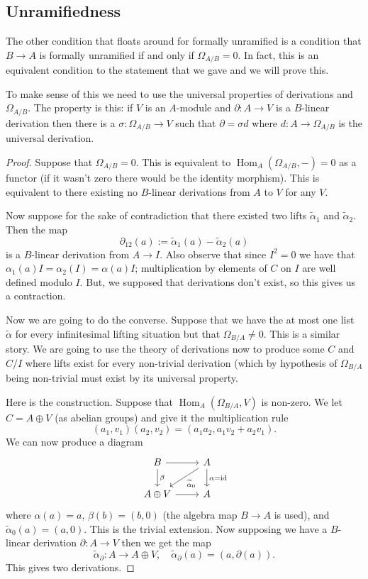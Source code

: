 \documentclass[12pt]{article}
\numberwithin{equation}{section}
\theoremstyle{definition}
\theoremstyle{remark}
\newcommand{\id}{\operatorname{id}}
\newcommand{\Hom}{\operatorname{Hom}}
\begin{document}
\subsection{Unramifiedness}
The other condition that floats around for formally unramified is a condition that $B\to A$ is formally unramified if and only if $\Omega_{A/B}=0$. 
In fact, this is an equivalent condition to the statement that we gave and we will prove this. 

To make sense of this we need to use the universal properties of derivations and $\Omega_{A/B}$. The property is this: if $V$ is an $A$-module and $\partial:A\to V$ is a $B$-linear derivation then there is a $\sigma: \Omega_{A/B} \to V$ such that $\partial = \sigma d$ where $d:A \to \Omega_{A/B}$ is the universal derivation.

\begin{proof}
	Suppose that $\Omega_{A/B}=0$. 
	This is equivalent to $\Hom_A(\Omega_{A/B},-)=0$ as a functor (if it wasn't zero there would be the identity morphism).
	This is equivalent to there existing no $B$-linear derivations from $A$ to $V$ for any $V$. 
	
	Now suppose for the sake of contradiction that there existed two lifts $\widetilde{\alpha}_1$ and $\widetilde{\alpha}_2$. 
	Then the map 
	$$\partial_{12}(a) := \widetilde{\alpha}_1(a) - \widetilde{\alpha}_2(a)$$ 
	is a $B$-linear derivation from $A \to I$. 
	Also observe that since $I^2=0$ we have that $\alpha_1(a)I = \alpha_2(I) = \alpha(a) I$; multiplication by elements of $C$ on $I$ are well defined modulo $I$.
	But, we supposed that derivations don't exist, so this gives us a contraction.
	
	Now we are going to do the converse.
	Suppose that we have the at most one list $\widetilde{\alpha}$ for every infinitesimal lifting situation but that $\Omega_{B/A}\neq 0$. 
	This is a similar story. 
	We are going to use the theory of derivations now to produce some $C$ and $C/I$ where lifts exist for every non-trivial derivation (which by hypothesis of $\Omega_{B/A}$ being non-trivial must exist by its universal property.
	
	Here is the construction. Suppose that $\Hom_A(\Omega_{B/A},V)$ is non-zero. 
	We let $C = A\oplus V$ (as abelian groups) and give it the multiplication rule 
	$$ (a_1,v_1)(a_2,v_2) = (a_1a_2,a_1v_2+a_2v_1).$$
	We can now produce a diagram 
	$$ 
	\begin{tikzcd}
	B \ar[r] \ar[d, "\beta"] & A \ar[d, "\alpha=\id"] \ar[dl, "\widetilde{\alpha}_0"] \\
	A \oplus V \ar[r] & A
	\end{tikzcd}
	$$
	where $\alpha(a)=a$, $\beta(b) = (b,0)$ (the algebra map $B\to A$ is used), and $\widetilde{\alpha}_0(a) = (a,0)$.
	This is the trivial extension.
	Now supposing we have a $B$-linear derivation $\partial:A \to V$ then we get the map 
	$$\widetilde{\alpha}_{\partial}: A \to A\oplus V, \quad \widetilde{\alpha}_{\partial}(a) = (a,\partial(a)). $$
	This gives two derivations. 
\end{proof}
\end{document}

